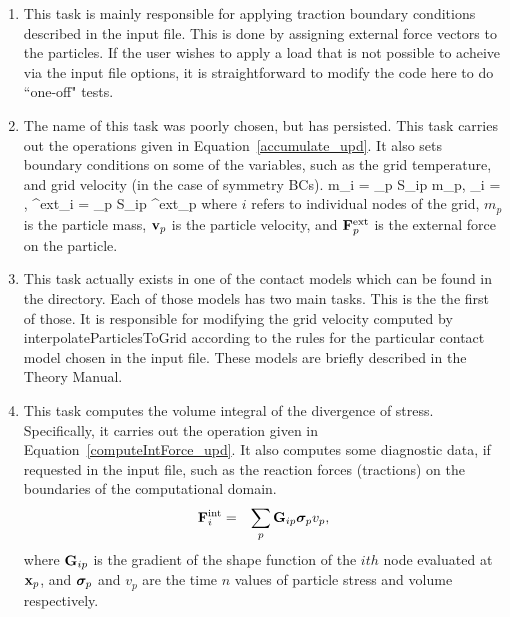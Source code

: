 \begin{enumerate}
\item {} This task is mainly responsible for
applying traction boundary conditions described in the input file.  This is
done by assigning external force vectors to the particles.  If the user
wishes to apply a load that is not possible to acheive via the input file
options, it is straightforward to modify the code here to do ``one-off" tests.

\item {}   The name of this task was
poorly chosen, but has persisted.  This task carries out the operations given
in Equation~\ref{accumulate_upd}.  It also sets boundary conditions on some of
the variables, such as the grid temperature, and grid velocity 
(in the case of symmetry BCs).
\Beq
m_i = \sum_{p} S_{ip} m_p,  \quad
\bfv_i = ,  \quad
\bfF^{\rm{ext}}_i = \sum_{p} S_{ip} \bfF^{\rm{ext}}_p
\label{accumulate_upd}
\Eeq
where $i$ refers to individual nodes of the grid,  $m_p$ is the particle
mass, ${\bf v}_p$ is the particle velocity, and ${\bf F}^{\rm{ext}}_p$ is the
external force on the particle.

\item {}  This task actually exists in one
of the contact models which can be found in the  directory.  Each of those
models has two main tasks. This is the the first of those. It is responsible
for modifying the grid velocity computed by interpolateParticlesToGrid according
to the rules for the particular contact model chosen in the input file.  These
models are briefly described in the \Vaango Theory Manual.

\item {} This task computes the volume
integral of the divergence of stress.  Specifically, it carries out the
operation given in Equation~\ref{computeIntForce_upd}.  It also computes some
diagnostic data, if requested in the input file, such as the reaction forces
(tractions) on the boundaries of the computational domain.
\begin{eqnarray}
{\bf F}^{\rm{int}}_i &=& \sum_{p} {\bf G}_{ip} \mbox{\boldmath $\sigma \!\!$ \unboldmath}_p v_p,
\label{computeIntForce_upd}  
\end{eqnarray}
where ${\bf G}_{ip}$ is the gradient of the shape function of the $ith$ node
evaluated at ${\bf x}_p$, and $\mbox{\boldmath $\sigma \!\!$ \unboldmath}_p$ and $v_p$ are the time $n$ values of
particle stress and volume respectively.  


\end{enumerate}
